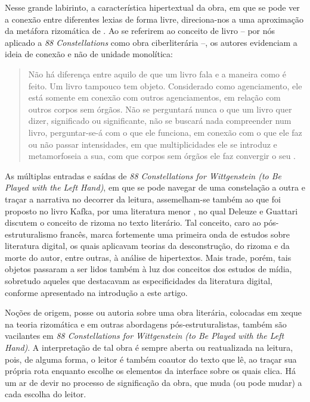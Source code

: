 \documentclass[portuguese]{textolivre}
\begin{document}
Nesse grande labirinto, a característica hipertextual da obra, em que se pode ver a conexão entre diferentes lexias de forma livre, direciona-nos a uma aproximação da metáfora rizomática de \textcite{deleuze1997}. Ao se referirem ao conceito de livro – por nós aplicado a \emph{88 Constellations} como obra ciberliterária –, os autores evidenciam a ideia de conexão e não de unidade monolítica:

\begin{quote}
Não há diferença entre aquilo de que um livro fala e a maneira como é feito. Um livro tampouco tem objeto. Considerado como agenciamento, ele está somente em conexão com outros agenciamentos, em relação com outros corpos sem órgãos. Não se perguntará nunca o que um livro quer dizer, significado ou significante, não se buscará nada compreender num livro, perguntar-se-á com o que ele funciona, em conexão com o que ele faz ou não passar intensidades, em que multiplicidades ele se introduz e metamorfoseia a sua, com que corpos sem órgãos ele faz convergir o seu \cite[p. 11]{deleuze1997}.
\end{quote}

As múltiplas entradas e saídas de \emph{88 Constellations for Wittgenstein (to Be Played with the Left Hand)}, em que se pode navegar de uma constelação a outra e traçar a narrativa no decorrer da leitura, assemelham-se também ao que foi proposto no livro Kafka, por uma literatura menor \cite*{deleuze1977}, no qual Deleuze e Guattari discutem o conceito de rizoma no texto literário. Tal conceito, caro ao pós-estruturalismo francês, marca fortemente uma primeira onda de estudos sobre literatura digital, os quais aplicavam teorias da desconstrução, do rizoma e da morte do autor, entre outras, à análise de hipertextos. Mais trade, porém, tais objetos passaram a ser lidos também à luz dos conceitos dos estudos de mídia, sobretudo aqueles que destacavam as especificidades da literatura digital, conforme apresentado na introdução a este artigo.

Noções de origem, posse ou autoria sobre uma obra literária, colocadas em xeque na teoria rizomática e em outras abordagens pós-estruturalistas, também são vacilantes em \emph{88 Constellations for Wittgenstein (to Be Played with the Left Hand)}. A interpretação de tal obra é sempre aberta ou reatualizada na leitura, pois, de alguma forma, o leitor é também coautor do texto que lê, ao traçar sua própria rota enquanto escolhe os elementos da interface sobre os quais clica. Há um ar de devir no processo de significação da obra, que muda (ou pode mudar) a cada escolha do leitor. 
\end{document}
